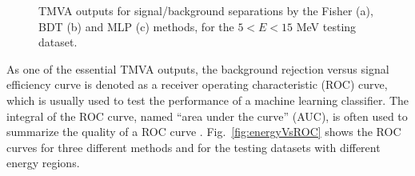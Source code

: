 \begin{figure}[htbp]
	\centering
	\caption[TMVA outputs for signal/background separations by different methods.]{TMVA outputs for signal/background separations by the Fisher (a), BDT (b) and MLP (c) methods, for the $5<E<15$ MeV testing dataset.\label{output_separation_allE}}
\end{figure}
As one of the essential TMVA outputs, the background rejection versus signal efficiency curve is denoted as a receiver operating characteristic (ROC) curve, which is usually used to test the performance of a machine learning classifier. The integral of the ROC curve, named ``area under the curve'' (AUC), is often used to summarize the quality of a ROC curve \cite{murphy2012machine}. Fig.~\ref{fig:energyVsROC} shows the ROC curves for three different methods and for the testing datasets with different energy regions.

